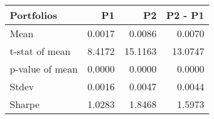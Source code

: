 \begin{tabular}{lrrr}
\toprule
Portfolios & P1 & P2 & P2 - P1 \\
\midrule
Mean & 0.0017 & 0.0086 & 0.0070 \\
t-stat of mean & 8.4172 & 15.1163 & 13.0747 \\
p-value of mean & 0.0000 & 0.0000 & 0.0000 \\
Stdev & 0.0016 & 0.0047 & 0.0044 \\
Sharpe & 1.0283 & 1.8468 & 1.5973 \\
\bottomrule
\end{tabular}
